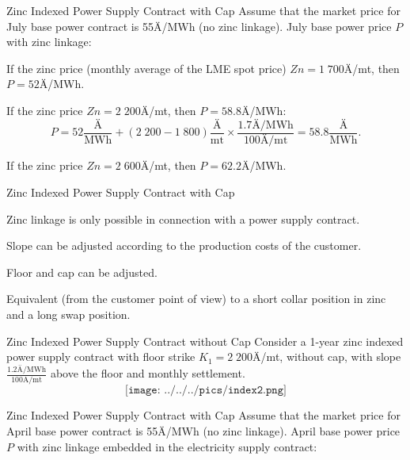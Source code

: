 {Zinc Indexed Power Supply Contract with Cap}
Assume that the market price for July base power contract is \textcolor[rgb]{1.00,0.00,0.00}{55Ä/MWh} (no zinc linkage). July base power price $P$ with zinc linkage:\\
\vspace{0.2cm}






	If the zinc price (monthly average of the LME spot price) $Zn=1\;700$Ä/mt, then \textcolor[rgb]{0.00,0.00,1.00}{$P=52$Ä/MWh}.


	If the zinc price $Zn=2\;200$Ä/mt, then \textcolor[rgb]{0.00,0.00,1.00}{$P=58.8$Ä/MWh}:
  $$P=52\frac{\text{Ä}}{\text{MWh}}+(2\;200-1\;800)\frac{\text{Ä}}{\text{mt}}\times\frac{1.7\text{Ä/MWh}}{100\text{Ä/mt}}=58.8\frac{\text{Ä}}{\text{MWh}}.$$


	If the zinc price $Zn=2\;600$Ä/mt, then \textcolor[rgb]{0.00,0.00,1.00}{$P=62.2$Ä/MWh}.





{Zinc Indexed Power Supply Contract with Cap}






	Zinc linkage is only possible in connection with a power supply contract.


	Slope can be adjusted according to the production costs of the customer.


	Floor and cap can be adjusted.


	Equivalent (from the customer point of view) to a short collar position in zinc and a long swap position.





{Zinc Indexed Power Supply Contract without Cap}
Consider a 1-year zinc indexed power supply contract with floor strike $K_1=2\;200$Ä/mt, without cap, with slope $\frac{1.2\text{Ä/MWh}}{100\text{Ä/mt}}$ above the floor and monthly settlement.
$$\texttt{[image: ../../../pics/index2.png]}$$

{Zinc Indexed Power Supply Contract with Cap}
Assume that the market price for April base power contract is \textcolor[rgb]{1.00,0.00,0.00}{55Ä/MWh} (no zinc linkage). April base power price $P$ with zinc linkage embedded in the electricity supply contract:
\vspace{0.4cm}


